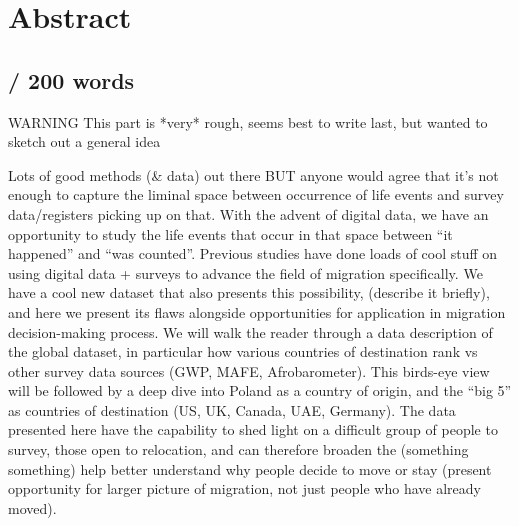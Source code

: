 \section*{Abstract}
\subsection*{ / 200 words}
WARNING
This part is *very* rough, seems best to write last, but wanted to sketch out a general idea

Lots of good methods (\& data) out there BUT anyone would agree that it’s not enough to capture the liminal space between occurrence of life events and survey data/registers picking up on that. With the advent of digital data, we have an opportunity to study the life events that occur in that space between “it happened” and “was counted”. Previous studies have done loads of cool stuff on using digital data + surveys to advance the field of migration specifically. We have a cool new dataset that also presents this possibility, (describe it briefly), and here we present its flaws alongside opportunities for application in migration decision-making process.
We will walk the reader through a data description of the global dataset, in particular how various countries of destination rank vs other survey data sources (GWP, MAFE, Afrobarometer). This birds-eye view will be followed by a deep dive into Poland as a country of origin, and the “big 5” as countries of destination (US, UK, Canada, UAE, Germany).
The data presented here have the capability to shed light on a difficult group of people to survey, those open to relocation, and can therefore broaden the (something something) help better understand why people decide to move or stay (present opportunity for larger picture of migration, not just people who have already moved).


